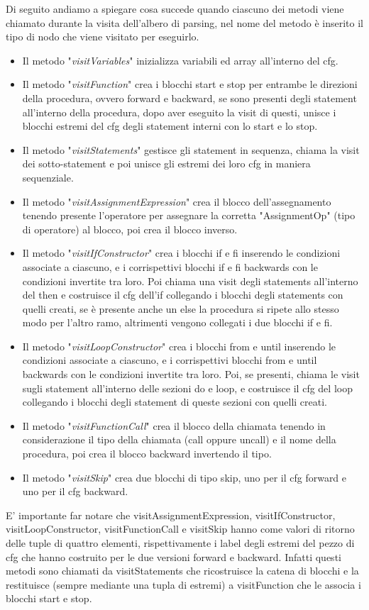 \documentclass{article}
\theoremstyle{plain}
\theoremstyle{definition}
\theoremstyle{plain}
\begin{document}
Di seguito andiamo a spiegare cosa succede quando ciascuno dei metodi viene chiamato durante la visita dell'albero di parsing, nel nome del metodo è inserito il tipo di nodo che viene visitato per eseguirlo.
\begin{itemize}
\item Il metodo "\emph{visitVariables}" inizializza variabili ed array all'interno del cfg. 
\item Il metodo "\emph{visitFunction}" crea i blocchi start e stop per entrambe le direzioni della procedura, ovvero forward e backward, se sono presenti degli statement all'interno della procedura, dopo aver eseguito la visit di questi, unisce i blocchi estremi del cfg degli statement interni con lo start e lo stop.
\item Il metodo "\emph{visitStatements}" gestisce gli statement in sequenza, chiama la visit dei sotto-statement e poi unisce gli estremi dei loro cfg in maniera sequenziale.
\item Il metodo "\emph{visitAssignmentExpression}" crea il blocco dell'assegnamento tenendo presente l'operatore per assegnare la corretta "AssignmentOp" (tipo di operatore) al blocco, poi crea il blocco inverso.
\item Il metodo "\emph{visitIfConstructor}" crea i blocchi if e fi inserendo le condizioni associate a ciascuno, e i corrispettivi blocchi if e fi backwards con le condizioni invertite tra loro. Poi chiama una visit degli statements all'interno del then e costruisce il cfg dell'if collegando i blocchi degli statements con quelli creati, se è presente anche un else la procedura si ripete allo stesso modo per l'altro ramo, altrimenti vengono collegati i due blocchi if e fi.
\item Il metodo "\emph{visitLoopConstructor}" crea i blocchi from e until inserendo le condizioni associate a ciascuno, e i corrispettivi blocchi from e until backwards con le condizioni invertite tra loro. Poi, se presenti, chiama le visit sugli statement all'interno delle sezioni do e loop, e costruisce il cfg del loop collegando i blocchi degli statement di queste sezioni con quelli creati.
\item Il metodo "\emph{visitFunctionCall}" crea il blocco della chiamata tenendo in considerazione il tipo della chiamata (call oppure uncall) e il nome della procedura, poi crea il blocco backward invertendo il tipo.
\item Il metodo "\emph{visitSkip}" crea due blocchi di tipo skip, uno per il cfg forward e uno per il cfg backward.
\end{itemize}
E' importante far notare che visitAssignmentExpression, visitIfConstructor, visitLoopConstructor, visitFunctionCall e visitSkip hanno come valori di ritorno delle tuple di quattro elementi, rispettivamente i label degli estremi del pezzo di cfg che hanno costruito per le due versioni forward e backward. Infatti questi metodi sono chiamati da visitStatements che ricostruisce la catena di blocchi e la restituisce (sempre mediante una tupla di estremi) a visitFunction che le associa i blocchi start e stop.
\end{document}
